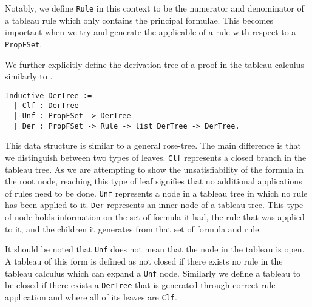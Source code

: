 \documentclass{llncs}
\begin{document}
Notably, we define \verb+Rule+ in this context to be the numerator and
denominator of a tableau rule which only contains the principal formulae. This
becomes important when we try and generate the applicable of a rule with
respect to a \verb+PropFSet+.

We further explicitly define the derivation tree of a proof in the tableau
calculus similarly to \cite{dawson2003new}.
%
\begin{verbatim}
Inductive DerTree :=
  | Clf : DerTree
  | Unf : PropFSet -> DerTree
  | Der : PropFSet -> Rule -> list DerTree -> DerTree.
\end{verbatim}
%
This data structure is similar to a general rose-tree. The main difference is
that we distinguish between two types of leaves. \verb+Clf+ represents a closed
branch in the tableau tree. As we are attempting to show the unsatisfiability
of the formula in the root node, reaching this type of leaf signifies that no
additional applications of rules need to be done. \verb+Unf+ represents a node
in a tableau tree in which no rule has been applied to it. \verb+Der+
represents an inner node of a tableau tree. This type of node holds information
on the set of formula it had, the rule that was applied to it, and the children
it generates from that set of formula and rule.

It should be noted that \verb+Unf+ does not mean that the node in the tableau
is open. A tableau of this form is defined as not closed if there exists no
rule in the tableau calculus which can expand a \verb+Unf+ node. Similarly we
define a tableau to be closed if there exists a \verb+DerTree+ that is
generated through correct rule application and where all of its leaves are
\verb+Clf+.
\end{document}
